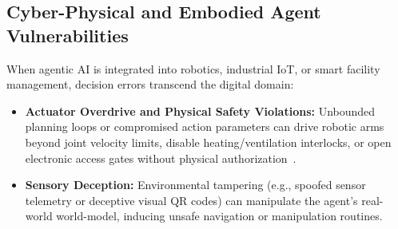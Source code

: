 \subsection{Cyber-Physical and Embodied Agent Vulnerabilities}
\label{subsec:embodied_agents}

When agentic AI is integrated into robotics, industrial IoT, or smart facility management, decision errors transcend the digital domain:
\begin{itemize}
    \item \textbf{Actuator Overdrive and Physical Safety Violations:} Unbounded planning loops or compromised action parameters can drive robotic arms beyond joint velocity limits, disable heating/ventilation interlocks, or open electronic access gates without physical authorization~\cite{narajala2025securing}.
    \item \textbf{Sensory Deception:} Environmental tampering (e.g., spoofed sensor telemetry or deceptive visual QR codes) can manipulate the agent's real-world world-model, inducing unsafe navigation or manipulation routines.
\end{itemize}
